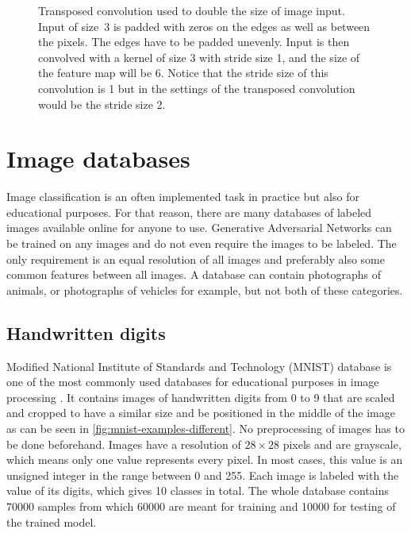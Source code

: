 \begin{figure}[!h]
    \caption{\label{fig:transposed-convolution}Transposed convolution used to double the size of image input. Input of size~3 is padded with zeros on the edges as well as between the pixels. The edges have to be padded unevenly. Input is then convolved with a kernel of size 3 with stride size 1, and the size of the feature map will be 6. Notice that the stride size of this convolution is 1 but in the settings of the transposed convolution would be the stride size 2.}
\end{figure}


\section{\label{sec:image-databases}Image databases}
Image classification is an often implemented task in practice but also for educational purposes. For that reason, there are many databases of labeled images available online for anyone to use. Generative Adversarial Networks can be trained on any images and do not even require the images to be labeled. The only requirement is an equal resolution of all images and preferably also some common features between all images. A database can contain photographs of animals, or photographs of vehicles for example, but not both of these categories.

\subsection*{\label{sec:mnist-database}Handwritten digits}
Modified National Institute of Standards and Technology (MNIST) database is one of the most commonly used databases for educational purposes in image processing \cite{lecun-mnisthandwrittendigit-2010}. It contains images of handwritten digits from 0 to 9 that are scaled and cropped to have a similar size and be positioned in the middle of the image as can be seen in \autoref{fig:mnist-examples-different}. No preprocessing of images has to be done beforehand. Images have a resolution of $28 \times 28$ pixels and are grayscale, which means only one value represents every pixel. In most cases, this value is an unsigned integer in the range between 0 and 255. Each image is labeled with the value of its digits, which gives 10 classes in total. The whole database contains 70000 samples from which 60000 are meant for training and 10000 for testing of the trained model.

